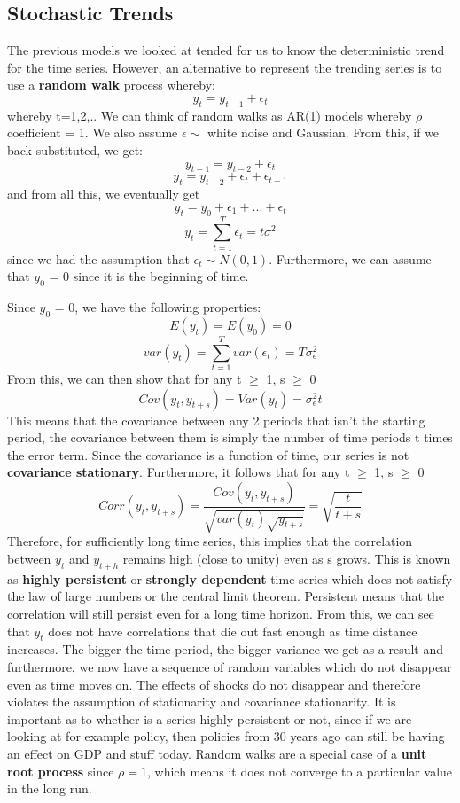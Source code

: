 \documentclass[11pt, oneside]{article}
\theoremstyle{definition}
\begin{document}
\subsection{Stochastic Trends}
The previous models we looked at tended for us to know the deterministic trend for the time series. However, an alternative to represent the trending series is to use a \textbf{random walk} process whereby:
$$
y_t = y_{t-1} + \epsilon_t
$$
whereby t=1,2,.. We can think of random walks as AR(1) models whereby $\rho$ coefficient = 1. We also assume $\epsilon \sim $ white noise and Gaussian. From this, if we back substituted, we get:
$$
y_{t-1} = y_{t-2} + \epsilon_t
$$
$$
y_t = y_{t-2} + \epsilon_t + \epsilon_{t-1}
$$
and from all this, we eventually get
$$
y_t = y_{0} + \epsilon_1 + ... + \epsilon_t
$$
$$
y_t = \sum_{t=1}^{T}\epsilon_t = t\sigma^2
$$
since we had the assumption that $\epsilon_t \sim N(0,1)$. Furthermore, we can assume that $y_0$ = 0 since it is the beginning of time.

Since $y_0$ = 0, we have the following properties:
$$
E(y_t) = E(y_0) = 0
$$
$$
var(y_t) = \sum_{t=1}^{T}var(\epsilon_t) = T\sigma_{\epsilon}^2
$$
From this, we can then show that for any t $\geq$ 1, s $\geq$ 0
$$
Cov(y_t,y_{t+s}) = Var(y_t) = \sigma_{\epsilon}^2t
$$
This means that the covariance between any 2 periods that isn't the starting period, the covariance between them is simply the number of time periods t times the error term. Since the covariance is a function of time, our series is not \textbf{covariance stationary}. Furthermore, it follows that for any t $\geq$ 1, s $\geq$ 0
$$
Corr(y_t,y_{t+s}) = \frac{Cov(y_t,y_{t+s})}{\sqrt{var(y_t)\sqrt{y_{t+s}}}} = \sqrt{\frac{t}{t+s}}
$$
Therefore, for sufficiently long time series, this implies that the correlation between $y_t$ and $y_{t+h}$ remains high (close to unity) even as s grows. This is known as \textbf{highly persistent} or \textbf{strongly dependent} time series which does not satisfy the law of large numbers or the central limit theorem. Persistent means that the correlation will still persist even for a long time horizon. From this, we can see that $y_t$ does not have correlations that die out fast enough as time distance increases. The bigger the time period, the bigger variance we get as a result and furthermore, we now have a sequence of random variables which do not disappear even as time moves on. The effects of shocks do not disappear and therefore violates the assumption of stationarity and covariance stationarity. It is important as to whether is a series highly persistent or not, since if we are looking at for example policy, then policies from 30 years ago can still be having an effect on GDP and stuff today. Random walks are a special case of a \textbf{unit root process} since $\rho=1$, which means it does not converge to a particular value in the long run.
\end{document}
